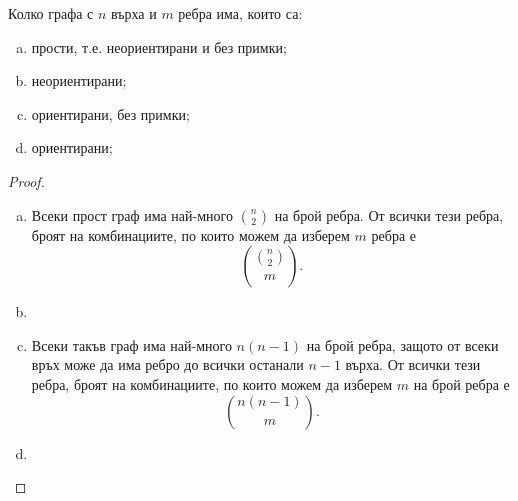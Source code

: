 \begin{problem}
  Колко графа с $n$ върха и $m$ ребра има, които са:
  \begin{enumerate}[a)]
  \item
    прости, т.е. неориентирани и без примки;
  \item
    неориентирани;
  \item
    ориентирани, без примки;
  \item
    ориентирани;
\end{enumerate}
\end{problem}
\begin{proof}
  \begin{enumerate}[a)]
  \item
    Всеки прост граф има най-много $\binom{n}{2}$ на брой ребра.
    От всички тези ребра, броят на комбинациите, по които можем да изберем $m$ ребра е 
    \[\binom{\binom{n}{2}}{m}.\]
  \item
  \item
    Всеки такъв граф има най-много $n(n-1)$ на брой ребра, защото
    от всеки връх може да има ребро до всички останали $n-1$ върха.
    От всички тези ребра, броят на комбинациите, по които можем да изберем $m$ на брой ребра е
    \[\binom{n(n-1)}{m}.\]
  \item
    
  \end{enumerate}
\end{proof}

